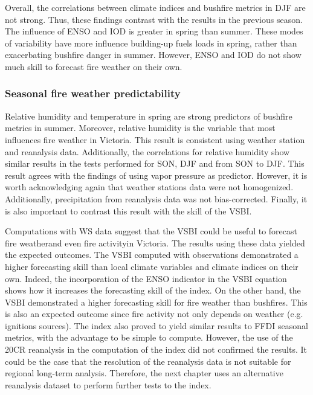 Overall, the correlations between climate indices and bushfire metrics
in DJF are not strong. Thus, these findings contrast with the results
in the previous season. The influence of ENSO and IOD is greater in
spring than summer. These modes of variability have more influence
building-up fuels loads in spring, rather than exacerbating bushfire
danger in summer. However, ENSO and IOD do not show much skill to
forecast fire weather on their own.


\subsubsection{Seasonal fire weather predictability}

Relative humidity and temperature in spring are strong predictors
of bushfire metrics in summer. Moreover, relative humidity is the
variable that most influences fire weather in Victoria. This result
is consistent using weather station and reanalysis data. Additionally,
the correlations for relative humidity show similar results in the
tests performed for SON, DJF and from SON to
DJF. This result agrees with the findings of \citet{Harris2013}
using vapor pressure as predictor. However, it is worth acknowledging
again that weather stations data were not homogenized. Additionally,
precipitation from reanalysis data was not bias-corrected. Finally,
it is also important to contrast this result with the skill of the
VSBI.

Computations with WS data suggest that the VSBI could be useful to
forecast fire weather\textemdash and even fire activity\textemdash in
Victoria. The results using these data yielded the expected outcomes.
The VSBI computed with observations demonstrated a higher forecasting
skill than local climate variables and climate indices on their own.
Indeed, the incorporation of the ENSO indicator in the VSBI equation
shows how it increases the forecasting skill of the index. On the
other hand, the VSBI demonstrated a higher forecasting skill for fire
weather than bushfires. This is also an expected outcome since fire
activity not only depends on weather (e.g. ignitions sources). The
index also proved to yield similar results to FFDI seasonal metrics,
with the advantage to be simple to compute. However, the use of the
20CR reanalysis in the computation of the index did not confirmed
the results. It could be the case that the resolution of the reanalysis
data is not suitable for regional long-term analysis. Therefore, the
next chapter uses an alternative reanalysis dataset to perform further
tests to the index. 


